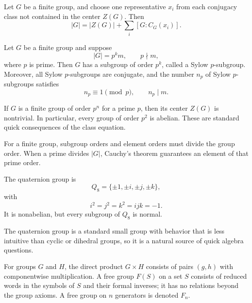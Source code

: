     \begin{theorem}
        Let $G$ be a finite group, and choose one representative $x_i$ from
        each conjugacy class not contained in the center $Z(G)$. Then
        \[
            |G|
            =
            |Z(G)|
            +
            \sum_i [G:C_G(x_i)].
        \]
    \end{theorem}

    \begin{theorem}
        Let $G$ be a finite group and suppose
        \[
            |G|=p^k m,
            \qquad
            p\nmid m,
        \]
        where $p$ is prime. Then $G$ has a subgroup of order $p^k$, called a
        Sylow $p$-subgroup. Moreover, all Sylow $p$-subgroups are conjugate, and
        the number $n_p$ of Sylow $p$-subgroups satisfies
        \[
            n_p\equiv 1\pmod p,
            \qquad
            n_p\mid m.
        \]
    \end{theorem}

    \begin{theorem}
        If $G$ is a finite group of order $p^n$ for a prime $p$, then its center
        $Z(G)$ is nontrivial. In particular, every group of order $p^2$ is
        abelian. These are standard quick consequences of the class equation.
    \end{theorem}

    \begin{strategy}
        For a finite group, subgroup orders and element orders must divide the group
        order. When a
        prime divides $|G|$, Cauchy's theorem guarantees an element of that prime
        order.
    \end{strategy}

    \begin{fact}
        The quaternion group is
        \[
            Q_8=\{\pm 1,\pm i,\pm j,\pm k\},
        \]
        with
        \[
            i^2=j^2=k^2=ijk=-1.
        \]
        It is nonabelian, but every subgroup of $Q_8$ is normal.
    \end{fact}

    \begin{remark}
        The quaternion group is a standard small group with behavior that is
        less intuitive than cyclic or dihedral groups, so it is a natural
        source of quick algebra questions.
    \end{remark}

    \begin{definition}
        For groups $G$ and $H$, the direct product $G\times H$ consists of
        pairs $(g,h)$ with componentwise multiplication. A free group
        $F(S)$ on a set $S$ consists of reduced words in the symbols of $S$ and
        their formal inverses; it has no relations beyond the group axioms. A
        free group on $n$ generators is denoted $F_n$.
    \end{definition}

